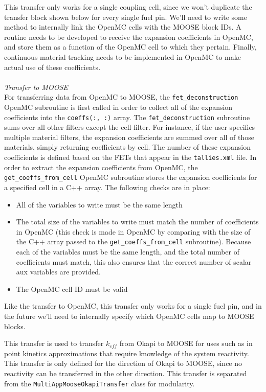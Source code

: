 \documentclass[10pt]{article}
\newcounter{subsubsubsection}[subsubsection]
\numberwithin{equation}{section} %
\begin{document}
\color{magenta}
This transfer only works for a single coupling cell, since we won't duplicate the transfer block shown below for every single fuel pin. We'll need to write some method to internally link the OpenMC cells with the MOOSE block IDs. A routine needs to be developed to receive the expansion coefficients in OpenMC, and store them as a function of the OpenMC cell to which they pertain. Finally, continuous material tracking needs to be implemented in OpenMC to make actual use of these coefficients.
\color{black}
\\\\
{\it Transfer to MOOSE}\\
For transferring data from OpenMC to MOOSE, the {\tt fet\_deconstruction} OpenMC subroutine is first called in order to collect all of the expansion coefficients into the {\tt coeffs(:, :)} array. The {\tt fet\_deconstruction} subroutine sums over all other filters except the cell filter. For instance, if the user specifies multiple material filters, the expansion coefficients are summed over all of those materials, simply returning coefficients by cell. The number of these expansion coefficients is defined based on the FETs that appear in the {\tt tallies.xml} file. In order to extract the expansion coefficients from OpenMC, the {\tt get\_coeffs\_from\_cell} OpenMC subroutine stores the expansion coefficients for a specified cell in a C++ array. The following checks are in place:

\begin{itemize}
\item All of the variables to write must be the same length
\item The total size of the variables to write must match the number of coefficients in OpenMC (this check is made in OpenMC by comparing with the size of the C++ array passed to the {\tt get\_coeffs\_from\_cell} subroutine). Because each of the variables must be the same length, and the total number of coefficients must match, this also ensures that the correct number of scalar aux variables are provided.
\item The OpenMC cell ID must be valid
\end{itemize}

\color{magenta}
Like the transfer to OpenMC, this transfer only works for a single fuel pin, and in the future we'll need to internally specify which OpenMC cells map to MOOSE blocks.
\color{black}

This transfer is used to transfer \(k_{eff}\) from Okapi to MOOSE for uses such as in point kinetics approximations that require knowledge of the system reactivity. This transfer is only defined for the direction of Okapi to MOOSE, since no reactivity can be transferred in the other direction. This transfer is separated from the {\tt MultiAppMooseOkapiTransfer} class for modularity.
\end{document}
